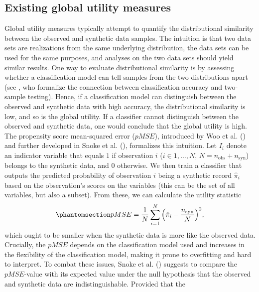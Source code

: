 \documentclass[
]{article}
\newcommand{\nobs}{n_{\text{obs}}}
\newcommand{\nsyn}{n_{\text{syn}}}
\begin{document}
\subsection{Existing global utility
measures}\label{existing-global-utility-measures}

Global utility measures typically attempt to quantify the distributional
similarity between the observed and synthetic data samples. The
intuition is that two data sets are realizations from the same
underlying distribution, the data sets can be used for the same
purposes, and analyses on the two data sets should yield similar
results. One way to evaluate distributional similarity is by assessing
whether a classification model can tell samples from the two
distributions apart (see , who formalize the connection between classification accuracy
and two-sample testing). Hence, if a classification model can
distinguish between the observed and synthetic data with high accuracy,
the distributional similarity is low, and so is the global utility. If a
classifier cannot distinguish between the observed and synthetic data,
one would conclude that the global utility is high. The propensity score
mean-squared error (\(pMSE\)), introduced by Woo et al.
() and further developed in Snoke et
al. (), formalizes this
intuition. Let \(I_i\) denote an indicator variable that equals \(1\) if
observation \(i\) (\(i \in 1, \dots, N\), \(N = \nobs + \nsyn\)) belongs
to the synthetic data, and \(0\) otherwise. We then train a classifier
that outputs the predicted probability of observation \(i\) being a
synthetic record \(\hat{\pi}_i\) based on the observation's scores on
the variables (this can be the set of all variables, but also a subset).
From these, we can calculate the utility statistic
\begin{equation}\phantomsection\label{eq-pMSE}{
pMSE = \frac{1}{N} \sum_{i=1}^N \Big(\hat{\pi}_i - \frac{\nsyn}{N}\Big)^2,
}\end{equation} which ought to be smaller when the synthetic data is
more like the observed data. Crucially, the \(pMSE\) depends on the
classification model used and increases in the flexibility of the
classification model, making it prone to overfitting and hard to
interpret. To combat these issues, Snoke et al.
() suggests to compare the
\(pMSE\)-value with its expected value under the null hypothesis that
the observed and synthetic data are indistinguishable. Provided that the
\end{document}

